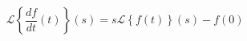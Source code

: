 \documentclass{article}
\newcommand{\Laplace}[1]{\mathcal{L}\left\{#1\right\}(s)}
\begin{document}
$$
    \Laplace{\frac{df}{dt}(t)} = s\Laplace{f(t)} - f(0)
$$
\end{document}
